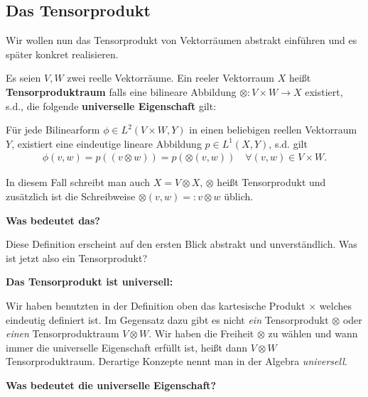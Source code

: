 \subsection{Das Tensorprodukt}
\label{\detokenize{vektoranalysis/tensor:das-tensorprodukt}}
\par
Wir wollen nun das Tensorprodukt von Vektorräumen abstrakt einführen und es später konkret realisieren.
\label{vektoranalysis/tensor:definition-1}
\begin{definition}{}{}



\par
Es seien \(V,W\) zwei reelle Vektorräume. Ein reeler Vektorraum \(X\) heißt \textbf{Tensorproduktraum} falls eine bilineare Abbildung \(\otimes:V\times W\rightarrow X\) existiert, s.d., die folgende \textbf{universelle Eigenschaft} gilt:

\par
Für jede Bilinearform \(\phi\in L^2(V\times W, Y)\) in einen beliebigen reellen Vektorraum \(Y\), existiert eine eindeutige lineare Abbildung
\(p \in L^1(X, Y)\), s.d. gilt
\begin{align*}
\phi(v,w) = p((v\otimes w)) = p(\otimes(v,w))\quad\forall (v,w)\in V\times W.
\end{align*}
\par
In diesem Fall schreibt man auch \(X = V\otimes X\), \(\otimes\) heißt Tensorprodukt und zusätzlich ist die Schreibweise \(\otimes(v,w)=:v\otimes w\) üblich.
\end{definition}

\par
\textbf{Was bedeutet das?}

\par
Diese Definition erscheint auf den ersten Blick abstrakt und unverständlich. Was ist jetzt also ein Tensorprodukt?

\par
\textbf{Das Tensorprodukt ist universell:}

\par
Wir haben benutzten in der Definition oben das kartesische Produkt \(\times\) welches eindeutig definiert ist. Im Gegensatz dazu gibt es nicht \emph{ein} Tensorprodukt \(\otimes\) oder \emph{einen} Tensorproduktraum \(V\otimes W\). Wir haben die Freiheit \(\otimes\) zu wählen und wann immer die universelle Eigenschaft erfüllt ist, heißt dann \(V\otimes W\) Tensorproduktraum. Derartige Konzepte nennt man in der Algebra \emph{universell}.

\par
\textbf{Was bedeutet die universelle Eigenschaft?}

